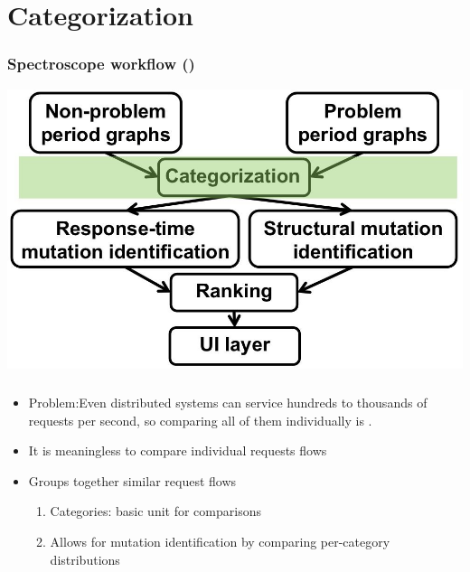\documentclass[11pt]{beamer}
\begin{document}
\section{Categorization}
\begin{frame}
\frametitle{Spectroscope workflow ()}
\includegraphics[width=\textwidth]{fig/work2.jpg}
\end{frame}

\begin{frame}
\frametitle{\secname}
\begin{itemize}
  \item \alert{Problem}:Even  distributed systems can service
  hundreds to thousands of requests per second, so comparing all of
  them individually is .
  \item It is meaningless to compare individual requests flows\pause
  \item Groups together similar request flows
  \begin{enumerate}
    \item Categories: basic unit for comparisons
    \item Allows for mutation identification by comparing per-category
    distributions
  \end{enumerate}
\end{itemize}
\end{frame}
\end{document}
